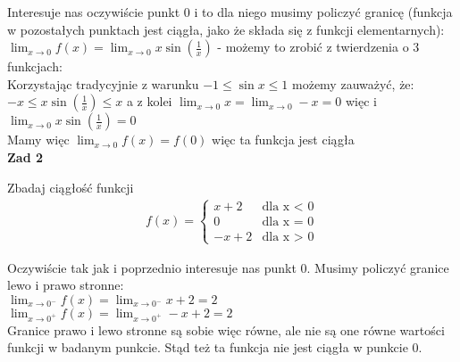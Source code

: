 \documentclass[main.tex]{subfiles}
\begin{document}
    \noindent Interesuje nas oczywiście punkt 0 i to dla niego musimy policzyć granicę (funkcja w pozostałych punktach jest ciągła, jako że składa się z funkcji elementarnych): \\

    \noindent $\lim_{x \to 0} f(x) = \lim_{x \to 0} x \sin\left(\frac{1}{x}\right)$ - możemy to zrobić z twierdzenia o 3 funkcjach: \\

    \noindent Korzystając tradycyjnie z warunku $-1 \leq \sin{x} \leq 1$ możemy zauważyć, że: \\

    \noindent $-x \leq x \sin\left(\frac{1}{x}\right) \leq x$ a z kolei $\lim_{x \to 0} x = \lim_{x \to 0} -x = 0$ więc i $\lim_{x \to 0} x \sin\left(\frac{1}{x}\right) = 0$ \\

    \noindent Mamy więc $\lim_{x \to 0} f(x) = f(0)$ więc ta funkcja jest ciągła \\


    \noindent \textbf{Zad 2}

    \begin{exercise}
        Zbadaj ciągłość funkcji \begin{align*}
                                    f(x) =
                                    \begin{cases}
                                        x + 2 & \text{dla x $<$ 0} \\
                                        0 & \text{dla x = 0} \\
                                        -x + 2 & \text{dla x $>$ 0}
                                    \end{cases}
        \end{align*}
    \end{exercise}

    \noindent Oczywiście tak jak i poprzednio interesuje nas punkt 0. Musimy policzyć granice lewo i prawo stronne: \\

    \noindent $\lim_{x \to 0^{-}} f(x) = \lim_{x \to 0^{-}} x + 2 = 2$ \\
    \noindent $\lim_{x \to 0^{+}} f(x) = \lim_{x \to 0^{+}} -x + 2 = 2$ \\

    \noindent Granice prawo i lewo stronne są sobie więc równe, ale nie są one równe wartości funkcji w badanym punkcie.
    Stąd też ta funkcja nie jest ciągła w punkcie 0. \\
\end{document}
